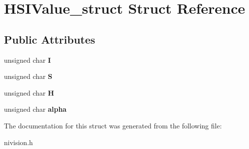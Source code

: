 \hypertarget{structHSIValue__struct}{
\section{HSIValue\_\-struct Struct Reference}
\label{structHSIValue__struct}
}
\subsection*{Public Attributes}
\begin{DoxyCompactItemize}
\item 
\hypertarget{structHSIValue__struct_acf9b0ddb930275bce308229fb95942ab}{
unsigned char {\bfseries I}}
\label{structHSIValue__struct_acf9b0ddb930275bce308229fb95942ab}

\item 
\hypertarget{structHSIValue__struct_af821e59a7ae0fc8c4c44e78960105d08}{
unsigned char {\bfseries S}}
\label{structHSIValue__struct_af821e59a7ae0fc8c4c44e78960105d08}

\item 
\hypertarget{structHSIValue__struct_a1aee48849414a70770953200526c4789}{
unsigned char {\bfseries H}}
\label{structHSIValue__struct_a1aee48849414a70770953200526c4789}

\item 
\hypertarget{structHSIValue__struct_aca41fd8feaeb0dce4e7b79d117c3e630}{
unsigned char {\bfseries alpha}}
\label{structHSIValue__struct_aca41fd8feaeb0dce4e7b79d117c3e630}

\end{DoxyCompactItemize}


The documentation for this struct was generated from the following file:\begin{DoxyCompactItemize}
\item 
nivision.h\end{DoxyCompactItemize}
